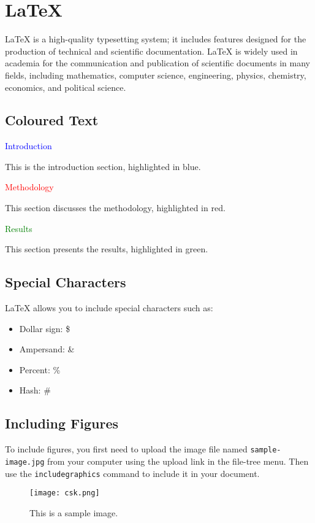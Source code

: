 \documentclass{article}
\begin{document}
	
	\section{LaTeX}
	LaTeX is a high-quality typesetting system; it includes features designed for the production of technical and scientific documentation. LaTeX is widely used in academia for the communication and publication of scientific documents in many fields, including mathematics, computer science, engineering, physics, chemistry, economics, and political science.
	
	\subsection{Coloured Text}
	\textcolor{blue}{Introduction}
	
	This is the introduction section, highlighted in blue.
	
	\textcolor{red}{Methodology}
	
	This section discusses the methodology, highlighted in red.
	
	\textcolor{green}{Results}
	
	This section presents the results, highlighted in green.
	
	\subsection{Special Characters}
	LaTeX allows you to include special characters such as:
	\begin{itemize}
		\item Dollar sign: \$
		\item Ampersand: \&
		\item Percent: \%
		\item Hash: \#
	\end{itemize}
	
	\subsection{Including Figures}
	To include figures, you first need to upload the image file named \texttt{sample-image.jpg} from your computer using the upload link in the file-tree menu. Then use the \texttt{includegraphics} command to include it in your document.
	
	\begin{figure}[h]
		\centering
		\texttt{[image: csk.png]}
		\caption{This is a sample image.}
	\end{figure}
	
\end{document}
